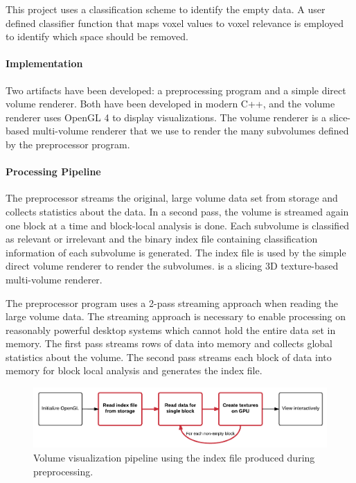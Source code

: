 \documentclass[journal]{vgtc}                %
\begin{document}
This project uses a classification scheme to identify the empty data. A user
defined classifier function that maps voxel values to voxel relevance is
employed to identify which space should be removed. 

\paragraph{Implementation}
Two artifacts have been developed: a preprocessing program and a simple direct
volume renderer.  Both have been developed in modern C++, and the volume
renderer uses OpenGL 4 to display visualizations. The volume renderer is
a slice-based multi-volume renderer that we use to 
render the many subvolumes defined by the preprocessor program.

\paragraph{Processing Pipeline} 
The preprocessor streams the original, large volume data set from storage and
collects statistics about the data. In a second pass, the volume is streamed
again one block at a time and block-local analysis is done. Each subvolume is
classified as relevant or irrelevant and the binary index file containing
classification information of each subvolume is generated.  The index file is
used by the simple direct volume renderer to render the subvolumes. is
a slicing 3D texture-based multi-volume renderer. 

The preprocessor program uses a 2-pass streaming approach when reading the
large volume data. The streaming approach is necessary to enable processing on
reasonably powerful desktop systems which cannot hold the entire data set in
memory. The first pass streams rows of data into memory and collects global
statistics about the volume. The second pass streams each block of data into
memory for block local analysis and generates the index file.

\begin{figure}[htb]\label{fig:initToViewFlowWithPartition}
	\begin{centering}
		\includegraphics[width=\linewidth,height=0.3\textheight,keepaspectratio]{init-to-view-with-index-file}
		\caption{Volume visualization pipeline using the index file produced during preprocessing.}
	\end{centering}
\end{figure}
\end{document}
